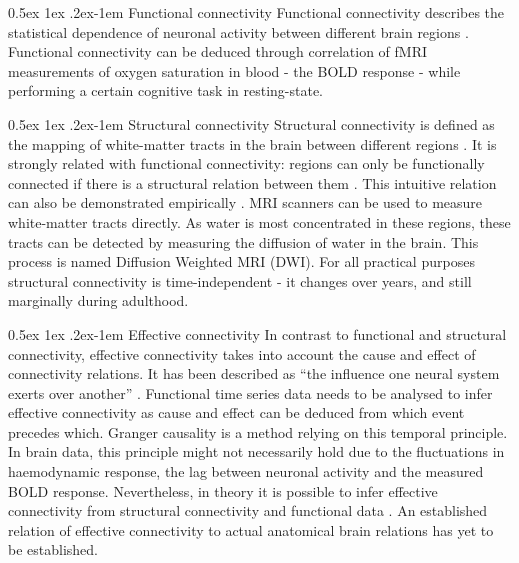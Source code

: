 \documentclass[a4paper, 10pt, english, onecolumn]{article}
\makeatletter
\renewcommand{\paragraph}{%
  \@startsection{paragraph}{4}%
  {\z@}{0.5ex \@plus 1ex \@minus .2ex}{-1em}%
  {\normalfont\normalsize\bfseries}%
}
\makeatother
\begin{document}
\paragraph{Functional connectivity}
Functional connectivity describes the statistical dependence of neuronal activity between different brain regions \cite{friston1993functional}.
Functional connectivity can be deduced through correlation of fMRI measurements of oxygen saturation  in blood - the BOLD response - while performing a certain cognitive task in resting-state.

\paragraph{Structural connectivity}
Structural connectivity is defined as the mapping of white-matter tracts in the brain between different regions \cite{friston1994}.
It is strongly related with functional connectivity: regions can only be functionally connected if there is a structural relation between them \cite{cabral2012}.
This intuitive relation can also be demonstrated empirically \cite{vandenheuvel2009}.
MRI scanners can be used to measure white-matter tracts directly.
As water is most concentrated in these regions, these tracts can be detected by measuring the diffusion of water in the brain.
This process is named Diffusion Weighted MRI (DWI).
For all practical purposes structural connectivity is time-independent - it changes over years, and still marginally during adulthood.

\paragraph{Effective connectivity}
In contrast to functional and structural connectivity, effective connectivity takes into account the cause and effect of connectivity relations.
It has been described as ``the influence one neural system exerts over another'' \cite{friston1994}.
Functional time series data needs to be analysed to infer effective connectivity as cause and effect can be deduced from which event precedes which.
Granger causality is a method relying on this temporal principle.
In brain data, this principle might not necessarily hold due to the fluctuations in haemodynamic response, the lag between neuronal activity and the measured BOLD response.
Nevertheless, in theory it is possible to infer effective connectivity from structural connectivity and functional data \cite{mclntosh1994, harrison2003, friston2003, roebroeck2005}.
An established relation of effective connectivity to actual anatomical brain relations has yet to be established.
\end{document}

